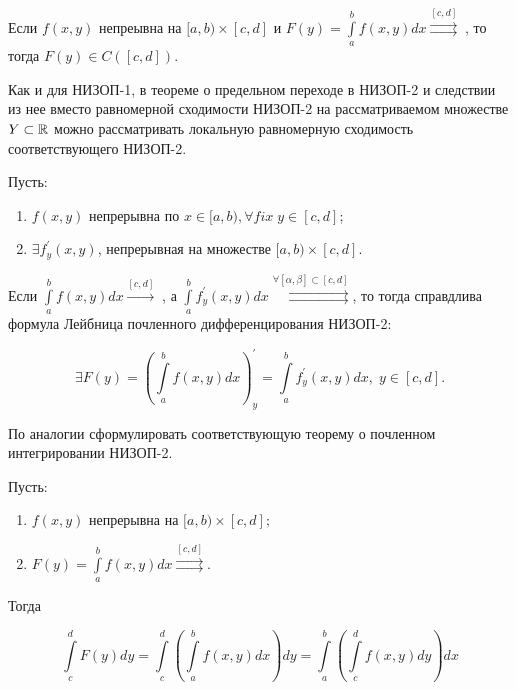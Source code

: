 \documentclass[../../main.tex]{subfiles}
\begin{document}
	\begin{crl*}
		Если $f(x, y)$ непреывна на $[a, b) \times [c, d]$ и $F(y) = \int\limits_a^b f(x, y) dx \overset{[c, d]}\rightrightarrows \;$, то тогда $F(y) \in C([c, d])$.
	\end{crl*}

	\begin{rem}
		Как и для НИЗОП-1, в теореме о предельном переходе в НИЗОП-2 и следствии из нее вместо равномерной сходимости НИЗОП-2 на рассматриваемом множестве $Y \subset \mathbb{R}$ можно рассматривать локальную равномерную сходимость соответствующего НИЗОП-2.
	\end{rem}

	\begin{thm}
		Пусть:

		\begin{enumerate}
			\item $f(x, y)$ непрерывна по $x \in [a, b), \forall fix \; y \in [c, d]$;
			\item $\exists f^{'}_{y} (x, y)$, непрерывная на множестве $[a, b) \times [c, d]$.
		\end{enumerate}

		Если $\int\limits_a^b f(x, y) dx \overset{[c, d]}\rightarrow\;$, а $\int\limits_a^b f^{'}_y (x, y) dx \overset{\forall [\alpha, \beta] \subset [c, d]}{\rightrightarrows}$, то тогда справдлива формула Лейбница почленного дифференцирования НИЗОП-2:
		
		$$
		\exists F(y) = \left( \int\limits_a^b f(x, y) dx \right)^{'}_y = \int\limits_a^b f^{'}_y (x, y) dx, \; y \in [c, d].
		$$
	\end{thm}

	\begin{exc}
		По аналогии сформулировать соответствующую теорему о почленном интегрировании НИЗОП-2.
	\end{exc}

	\begin{eans}
		Пусть:
		\begin{enumerate}
			\item $f(x, y)$ непрерывна на $[a, b) \times [c, d];$
			\item $F(y) = \int\limits_a^b f(x, y) dx \overset{[c, d]}{\rightrightarrows}.$
		\end{enumerate}
	
		Тогда
		
		$$
			\int\limits_c^d F(y) dy = \int\limits_c^d \left( \int\limits_a^b f(x, y) dx \right) dy = \int\limits_a^b \left( \int\limits_c^d f(x, y) dy \right) dx
		$$
	
	\end{eans}
\end{document}
